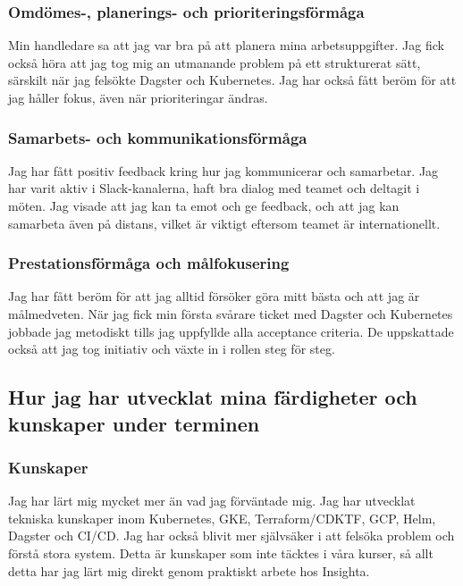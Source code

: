 \subsubsection{Omdömes-, planerings- och prioriteringsförmåga}
\label{subsubsec:omdome_feedback}

Min handledare sa att jag var bra på att planera mina arbetsuppgifter. Jag fick också höra att jag tog mig an utmanande problem på ett strukturerat sätt, särskilt när jag felsökte Dagster och Kubernetes. Jag har också fått beröm för att jag håller fokus, även när prioriteringar ändras.

\subsubsection{Samarbets- och kommunikationsförmåga}
\label{subsubsec:samarbete_feedback}

Jag har fått positiv feedback kring hur jag kommunicerar och samarbetar. Jag har varit aktiv i Slack-kanalerna, haft bra dialog med teamet och deltagit i möten. Jag visade att jag kan ta emot och ge feedback, och att jag kan samarbeta även på distans, vilket är viktigt eftersom teamet är internationellt.

\subsubsection{Prestationsförmåga och målfokusering}
\label{subsubsec:prestation_feedback}
Jag har fått beröm för att jag alltid försöker göra mitt bästa och att jag är målmedveten. När jag fick min första svårare ticket med Dagster och Kubernetes jobbade jag metodiskt tills jag uppfyllde alla acceptance criteria. De uppskattade också att jag tog initiativ och växte in i rollen steg för steg.


\subsection{Hur jag har utvecklat mina färdigheter och kunskaper under terminen}
\label{subsec:utveckling}
\subsubsection{Kunskaper}
\label{subsubsec:kunskaper_utveckling}
Jag har lärt mig mycket mer än vad jag förväntade mig. Jag har utvecklat tekniska kunskaper inom Kubernetes, GKE, Terraform/CDKTF, GCP, Helm, Dagster och CI/CD. Jag har också blivit mer självsäker i att felsöka problem och förstå stora system. Detta är kunskaper som inte täcktes i våra kurser, så allt detta har jag lärt mig direkt genom praktiskt arbete hos Insighta.

